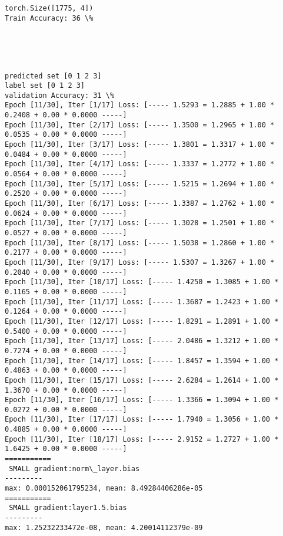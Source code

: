 \documentclass[11pt]{article}
\begin{document}
    \begin{Verbatim}[commandchars=\\\{\}]
torch.Size([1775, 4])
Train Accuracy: 36 \%

    \end{Verbatim}

    \begin{center}
    \end{center}
    { \hspace*{\fill} \\}
    
    \begin{center}
    \end{center}
    { \hspace*{\fill} \\}
    
    \begin{Verbatim}[commandchars=\\\{\}]
predicted set [0 1 2 3]
label set [0 1 2 3]
validation Accuracy: 31 \%
Epoch [11/30], Iter [1/17] Loss: [----- 1.5293 = 1.2885 + 1.00 * 0.2408 + 0.00 * 0.0000 -----]
Epoch [11/30], Iter [2/17] Loss: [----- 1.3500 = 1.2965 + 1.00 * 0.0535 + 0.00 * 0.0000 -----]
Epoch [11/30], Iter [3/17] Loss: [----- 1.3801 = 1.3317 + 1.00 * 0.0484 + 0.00 * 0.0000 -----]
Epoch [11/30], Iter [4/17] Loss: [----- 1.3337 = 1.2772 + 1.00 * 0.0564 + 0.00 * 0.0000 -----]
Epoch [11/30], Iter [5/17] Loss: [----- 1.5215 = 1.2694 + 1.00 * 0.2520 + 0.00 * 0.0000 -----]
Epoch [11/30], Iter [6/17] Loss: [----- 1.3387 = 1.2762 + 1.00 * 0.0624 + 0.00 * 0.0000 -----]
Epoch [11/30], Iter [7/17] Loss: [----- 1.3028 = 1.2501 + 1.00 * 0.0527 + 0.00 * 0.0000 -----]
Epoch [11/30], Iter [8/17] Loss: [----- 1.5038 = 1.2860 + 1.00 * 0.2177 + 0.00 * 0.0000 -----]
Epoch [11/30], Iter [9/17] Loss: [----- 1.5307 = 1.3267 + 1.00 * 0.2040 + 0.00 * 0.0000 -----]
Epoch [11/30], Iter [10/17] Loss: [----- 1.4250 = 1.3085 + 1.00 * 0.1165 + 0.00 * 0.0000 -----]
Epoch [11/30], Iter [11/17] Loss: [----- 1.3687 = 1.2423 + 1.00 * 0.1264 + 0.00 * 0.0000 -----]
Epoch [11/30], Iter [12/17] Loss: [----- 1.8291 = 1.2891 + 1.00 * 0.5400 + 0.00 * 0.0000 -----]
Epoch [11/30], Iter [13/17] Loss: [----- 2.0486 = 1.3212 + 1.00 * 0.7274 + 0.00 * 0.0000 -----]
Epoch [11/30], Iter [14/17] Loss: [----- 1.8457 = 1.3594 + 1.00 * 0.4863 + 0.00 * 0.0000 -----]
Epoch [11/30], Iter [15/17] Loss: [----- 2.6284 = 1.2614 + 1.00 * 1.3670 + 0.00 * 0.0000 -----]
Epoch [11/30], Iter [16/17] Loss: [----- 1.3366 = 1.3094 + 1.00 * 0.0272 + 0.00 * 0.0000 -----]
Epoch [11/30], Iter [17/17] Loss: [----- 1.7940 = 1.3056 + 1.00 * 0.4885 + 0.00 * 0.0000 -----]
Epoch [11/30], Iter [18/17] Loss: [----- 2.9152 = 1.2727 + 1.00 * 1.6425 + 0.00 * 0.0000 -----]
===========
 SMALL gradient:norm\_layer.bias
---------
max: 0.000152061795234, mean: 8.49284406286e-05
===========
 SMALL gradient:layer1.5.bias
---------
max: 1.25232233472e-08, mean: 4.20014112379e-09

    \end{Verbatim}
\end{document}
